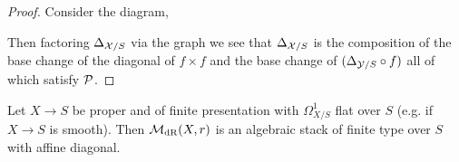 \documentclass[12pt]{article}
\begin{document}
\begin{proof}
Consider the diagram,
\begin{center}
\end{center}
Then factoring $\Delta_{\mathcal{X}/S}$ via the graph we see that $\Delta_{\mathcal{X}/S}$ is the composition of the base change of the diagonal of $f \times f$ and the base change of $(\Delta_{\mathcal{Y}/S} \circ f)$ all of which satisfy $\mathcal{P}$.
\end{proof}

\begin{prop}
Let $X \to S$ be proper and of finite presentation with $\Omega^1_{X/S}$ flat over $S$ (e.g. if $X \to S$ is smooth). Then $\mathcal{M}_{\mathrm{dR}}(X, r)$ is an algebraic stack of finite type over $S$ with affine diagonal.
\end{prop}
\end{document}

